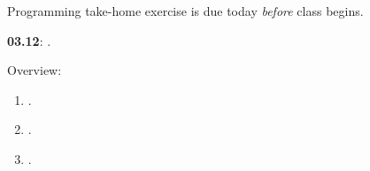 \documentclass[letterpaper]{article}
\renewenvironment{itemize}{
  \begin{list}{}{
    \setlength{\leftmargin}{1.5em}
  }
}{
  \end{list}
}
\begin{document}
\begin{enumerate}
\begin{itemize}
       
           \item[{\color{red}$\diamond$}] {\color{red}Programming take-home exercise is due today \emph{before} class begins}.

      \end{itemize}

\item {\bf 03.12}:  {\color{ForestGreen}{\bf Ethics}}.


      \begin{itemize} 

        \item[$\diamond$] Overview:

        \begin{enumerate}

          \item[$\bullet$] \href{https://doi.org/10.1017/CBO9780511762888.011}{}.

          \item[$\bullet$] \href{https://doi.org/10.1017/CBO9780511762888.012}{}.

          \item[$\bullet$] \href{https://doi.org/10.1017/CBO9780511762888.013}{}.

          \end{enumerate}

   
      \end{itemize}

\end{enumerate}


\newpage
\printbibliography

\end{document}
